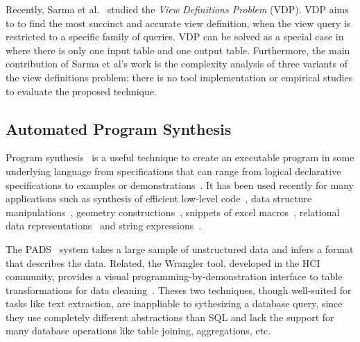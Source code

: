 Recently, Sarma et al.~\cite{DasSarma:2010} studied the \textit{View Definitions Problem} (VDP).
VDP aims to to find the most
succinct and accurate view definition, when
the view query is restricted to a specific family of queries.
VDP can be solved as a special case in \ourtool where there is only one
input table and one output table. Furthermore, the main contribution
of Sarma et al's work is the complexity analysis of
three variants of the view definitions problem; there is no
tool implementation or empirical studies to evaluate
the proposed technique.





\subsection{Automated Program Synthesis }


Program synthesis~\cite{Gulwani:2010:DPS} is a useful
technique to create an executable program
in some underlying language from specifications that can range
from logical declarative specifications to examples or
demonstrations~\cite{Harris:2011, singh:2012, Gulwani:2011,
Kandel:2011, Fisher08Pads,Lau:2003:PDU, Lau:2000:VSA, Barbosa:2010:MLA, Arasu:2009:LST}.
It has been used recently for many applications
such as synthesis of efficient low-level code~\cite{Solar-Lezama:2005},
data structure manipulations~\cite{Fisher:2008},
geometry constructions~\cite{Gulwani:2011:SGC},
snippets of excel macros~\cite{Harris:2011},
relational data representations~\cite{Barbosa:2010:MLA, Arasu:2009:LST} and string
expressions~\cite{singh:2012, Gulwani:2011}.


The PADS~\cite{Fisher:2008} system takes a large sample
of unstructured data and infers a
format that describes the data. Related,
the Wrangler tool, developed in the HCI community,
provides a visual programming-by-demonstration
interface to table transformations for data cleaning~\cite{Kandel:2011}.
Theses two techniques, though well-suited for tasks
like text extraction, are inappliable to
sythesizing a database query, since they use completely
different abstractions than SQL and lack the support
for many database operations like table joining, aggregations, etc.


